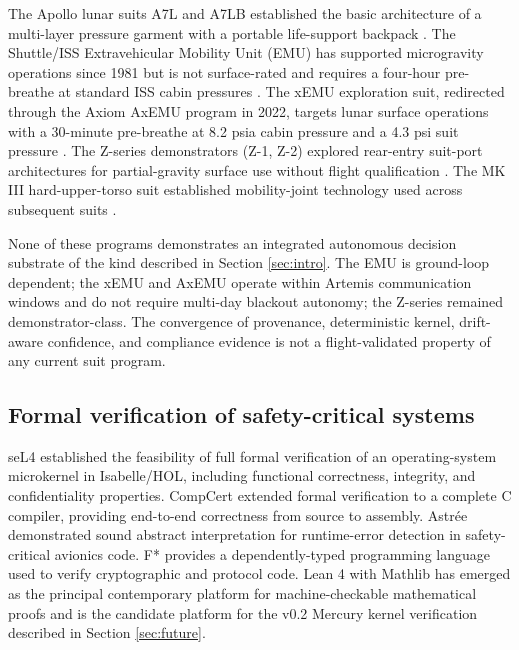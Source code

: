 \documentclass[conference]{IEEEtran}
\theoremstyle{definition}
\theoremstyle{plain}
\theoremstyle{remark}
\begin{document}
The Apollo lunar suits A7L and A7LB established the basic architecture of a multi-layer pressure garment with a portable life-support backpack \cite{thomas_evolution_2006,abramov_eva_2003}. The Shuttle/ISS Extravehicular Mobility Unit (EMU) has supported microgravity operations since 1981 but is not surface-rated and requires a four-hour pre-breathe at standard ISS cabin pressures \cite{nasa_emu_overview,sutton_eva_2018}. The xEMU exploration suit, redirected through the Axiom AxEMU program in 2022, targets lunar surface operations with a 30-minute pre-breathe at 8.2 psia cabin pressure and a 4.3 psi suit pressure \cite{nasa_xeva,nasa_artemis_axiomspacesuit,korona_xemu_2020}. The Z-series demonstrators (Z-1, Z-2) explored rear-entry suit-port architectures for partial-gravity surface use without flight qualification \cite{ross_z2_2014,jones_z1_2012}. The MK III hard-upper-torso suit established mobility-joint technology used across subsequent suits \cite{abramov_eva_2003}.

None of these programs demonstrates an integrated autonomous decision substrate of the kind described in Section \ref{sec:intro}. The EMU is ground-loop dependent; the xEMU and AxEMU operate within Artemis communication windows and do not require multi-day blackout autonomy; the Z-series remained demonstrator-class. The convergence of provenance, deterministic kernel, drift-aware confidence, and compliance evidence is not a flight-validated property of any current suit program.

\subsection{Formal verification of safety-critical systems}

seL4 \cite{klein_sel4_2009} established the feasibility of full formal verification of an operating-system microkernel in Isabelle/HOL, including functional correctness, integrity, and confidentiality properties. CompCert \cite{leroy_compcert_2009} extended formal verification to a complete C compiler, providing end-to-end correctness from source to assembly. Astrée \cite{cousot_astree_2005} demonstrated sound abstract interpretation for runtime-error detection in safety-critical avionics code. F* \cite{swamy_fstar_2016} provides a dependently-typed programming language used to verify cryptographic and protocol code. Lean 4 with Mathlib \cite{moura_lean4_2021,mathlib_2020} has emerged as the principal contemporary platform for machine-checkable mathematical proofs and is the candidate platform for the v0.2 Mercury kernel verification described in Section \ref{sec:future}.
\end{document}
